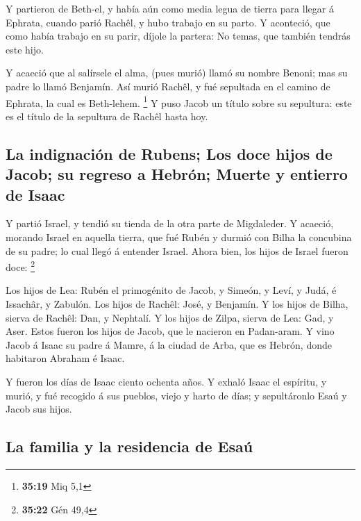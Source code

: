  Y partieron de Beth-el, y había aún como media legua de
tierra para llegar á Ephrata, cuando parió Rachêl, y hubo trabajo en su
parto.  Y aconteció, que como había trabajo en su parir,
díjole la partera: No temas, que también tendrás este hijo.

 Y acaeció que al salírsele el alma, (pues murió) llamó su
nombre Benoni; mas su padre lo llamó Benjamín.  Así murió
Rachêl, y fué sepultada en el camino de Ephrata, la cual es Beth-lehem.
\footnote{\textbf{35:19} Miq 5,1}  Y puso Jacob un título
sobre su sepultura: este es el título de la sepultura de Rachêl hasta
hoy.

\hypertarget{la-indignaciuxf3n-de-rubens-los-doce-hijos-de-jacob-su-regreso-a-hebruxf3n-muerte-y-entierro-de-isaac}{%
\subsection{La indignación de Rubens; Los doce hijos de Jacob; su
regreso a Hebrón; Muerte y entierro de
Isaac}\label{la-indignaciuxf3n-de-rubens-los-doce-hijos-de-jacob-su-regreso-a-hebruxf3n-muerte-y-entierro-de-isaac}}

 Y partió Israel, y tendió su tienda de la otra parte de
Migdaleder.  Y acaeció, morando Israel en aquella tierra,
que fué Rubén y durmió con Bilha la concubina de su padre; lo cual llegó
á entender Israel. Ahora bien, los hijos de Israel fueron doce:
\footnote{\textbf{35:22} Gén 49,4}

 Los hijos de Lea: Rubén el primogénito de Jacob, y Simeón,
y Leví, y Judá, é Issachâr, y Zabulón.  Los hijos de
Rachêl: José, y Benjamín.  Y los hijos de Bilha, sierva de
Rachêl: Dan, y Nephtalí.  Y los hijos de Zilpa, sierva de
Lea: Gad, y Aser. Estos fueron los hijos de Jacob, que le nacieron en
Padan-aram.  Y vino Jacob á Isaac su padre á Mamre, á la
ciudad de Arba, que es Hebrón, donde habitaron Abraham é Isaac.

 Y fueron los días de Isaac ciento ochenta años.
 Y exhaló Isaac el espíritu, y murió, y fué recogido á sus
pueblos, viejo y harto de días; y sepultáronlo Esaú y Jacob sus hijos.

\hypertarget{la-familia-y-la-residencia-de-esauxfa}{%
\subsection{La familia y la residencia de
Esaú}\label{la-familia-y-la-residencia-de-esauxfa}}

